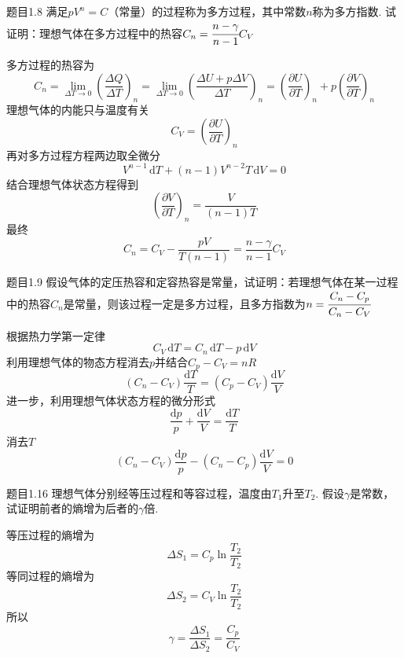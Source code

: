 \begin{question}{题目1.8}
    满足$pV^n=C$（常量）的过程称为多方过程，其中常数$n$称为多方指数. 试证明：理想气体在多方过程中的热容$C_n=\cfrac{n-\gamma}{n-1}C_V$
\end{question}
\begin{solution}
    多方过程的热容为
    $$
        C_n=\lim_{\Delta{T}\to0}\left(\frac{\Delta Q}{\Delta T}\right)_n
        =\lim_{\Delta{T}\to0}\left(\frac{\Delta U+p\Delta V}{\Delta T}\right)_n
        = \left(\frac{\partial U}{\partial T}\right)_n+p\left(\frac{\partial V}{\partial T}\right)_n
    $$
    理想气体的内能只与温度有关
    $$
        C_V = \left(\frac{\partial U}{\partial T} \right)_n
    $$
    再对多方过程方程两边取全微分
    $$
        V^{n-1}\,\mathrm{d}T+(n-1)V^{n-2}T\,\mathrm{d}V=0
    $$
    结合理想气体状态方程得到
    $$
        \left(\frac{\partial V}{\partial T}\right)_n = \frac{V}{(n-1)T}
    $$
    最终
    $$
        C_n=C_V-\frac{pV}{T(n-1)}=\frac{n-\gamma}{n-1}C_V
    $$
\end{solution}


\begin{question}{题目1.9}
    假设气体的定压热容和定容热容是常量，试证明：若理想气体在某一过程中的热容$C_n$是常量，则该过程一定是多方过程，且多方指数为$n=\cfrac{C_n-C_p}{C_n-C_V}$
\end{question}
\begin{solution}
    根据热力学第一定律
    $$
        C_V\,\mathrm{d}T=C_n\,\mathrm{d}T-p\,\mathrm{d}V
    $$
    利用理想气体的物态方程消去$p$并结合$C_p-C_V=nR$
    $$
        (C_n-C_V)\frac{\mathrm{d}T}{T}=(C_p-C_V)\frac{\mathrm{d}V}{V}
    $$
    进一步，利用理想气体状态方程的微分形式
    $$
        \frac{\mathrm{d}p}{p}+\frac{\mathrm{d}V}{V}=\frac{\mathrm{d}T}{T}
    $$
    消去$T$
    $$
        (C_n-C_V)\frac{\mathrm{d}p}{p}-(C_n-C_p)\frac{\mathrm{d}V}{V}=0
    $$
\end{solution}


\begin{question}{题目1.16}
    理想气体分别经等压过程和等容过程，温度由$T_1$升至$T_2$. 假设$\gamma$是常数，试证明前者的熵增为后者的$\gamma$倍.
\end{question}
\begin{solution}
    等压过程的熵增为
    $$
        \Delta{S_1}=C_p\ln\frac{T_2}{T_2}
    $$
    等同过程的熵增为
    $$
        \Delta{S_2}=C_V\ln\frac{T_2}{T_2}
    $$
    所以
    $$
        \gamma=\frac{\Delta{S_1}}{\Delta{S_2}}=\frac{C_p}{C_V}
    $$
\end{solution}


